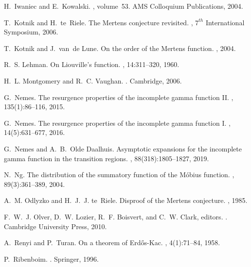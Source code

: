 \documentclass[11pt,reqno,a4letter]{article}
\numberwithin{equation}{section}
\numberwithin{figure}{section}
\numberwithin{table}{section}
\theoremstyle{plain}
\numberwithin{theorem}{section}
\theoremstyle{definition}
\begin{document}
\begin{thebibliography}{10}
H.~Iwaniec and E.~Kowalski.
, volume~53.
\newblock AMS Colloquium Publications, 2004.

T.~Kotnik and H.~te~Riele.
\newblock The {M}ertens conjecture revisited.
, $7^{th}$ International Symposium,
  2006.

T.~Kotnik and J.~van~de Lune.
\newblock On the order of the {M}ertens function.
, 2004.

R.~S. Lehman.
\newblock On {L}iouville's function.
, 14:311--320, 1960.

H.~L. Montgomery and R.~C. Vaughan.
.
\newblock Cambridge, 2006.

G.~Nemes.
\newblock The resurgence properties of the incomplete gamma function {II}.
, 135(1):86--116, 2015.

G.~Nemes.
\newblock The resurgence properties of the incomplete gamma function {I}.
, 14(5):631--677, 2016.

G.~Nemes and A.~B.~Olde Daalhuis.
\newblock Asymptotic expansions for the incomplete gamma function in the
  transition regions.
, 88(318):1805--1827, 2019.

N.~Ng.
\newblock The distribution of the summatory function of the {M}{\'{o}}bius
  function.
, 89(3):361--389, 2004.

A.~M. Odlyzko and H.~J.~J. te~Riele.
\newblock Disproof of the {M}ertens conjecture.
, 1985.

F.~W.~J. Olver, D.~W. Lozier, R.~F. Boisvert, and C.~W. Clark, editors.
.
\newblock Cambridge University Press, 2010.

A.~Renyi and P.~Turan.
\newblock On a theorem of {E}rd{\H{o}}s-{K}ac.
, 4(1):71--84, 1958.

P.~Ribenboim.
.
\newblock Springer, 1996.



\end{thebibliography}
\end{document}
